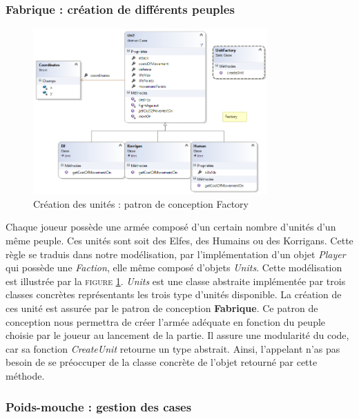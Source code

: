 		\subsubsection{Fabrique : création de différents peuples}

		\begin{figure}[h]
			\begin{center}
				\includegraphics[width=0.8\textwidth]{figure/factory.png}
			\end{center}
			\caption{Création des unités : patron de conception Factory}
			\label{fig:factory}
		\end{figure}

		Chaque joueur possède une armée composé d'un certain nombre d'unités d'un même peuple. Ces unités sont soit des Elfes, des Humains ou des Korrigans. Cette règle se traduis dans notre modélisation, par l'implémentation d'un objet \emph{Player} qui possède une \emph{Faction}, elle même composé d'objets \emph{Units}. Cette modélisation est illustrée par la \textsc{figure} \ref{fig:factory}. \emph{Units} est une classe abstraite implémentée par trois classes concrètes représentants les trois type d'unités disponible. La création de ces unité est assurée par le patron de conception \textbf{Fabrique}. Ce patron de conception nous permettra de créer l'armée adéquate en fonction du peuple choisie par le joueur au lancement de la partie. Il assure une modularité du code, car sa fonction \emph{CreateUnit} retourne un type abstrait. Ainsi, l'appelant n'as pas besoin de se préoccuper de la classe concrète de l'objet retourné par cette méthode. 


		\subsubsection{Poids-mouche : gestion des cases}

